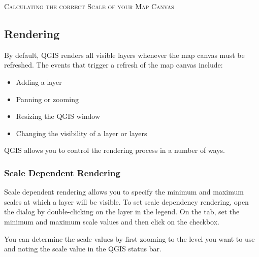 \begin{Tip}\caption{\textsc{Calculating the correct Scale of your Map Canvas}}
\end{Tip}

\subsection{Rendering}\label{subsec:redraw_events}

By default, QGIS renders all visible layers whenever the map canvas must be
refreshed. The events that trigger a refresh of the map canvas include:

\begin{itemize}
\item Adding a layer
\item Panning or zooming
\item Resizing the QGIS window
\item Changing the visibility of a layer or layers
\end{itemize}

QGIS allows you to control the rendering process in a number of ways.

\subsubsection{Scale Dependent Rendering}
\label{label_scaledepend}

Scale dependent rendering allows you to specify the minimum and maximum
scales at which a layer will be visible.  To set scale dependency rendering,
open the  dialog by double-clicking on the layer in the 
legend. On the  tab, set the minimum and maximum scale values and then
click on the  checkbox.

You can determine the scale values by first zooming to the level you want
to use and noting the scale value in the QGIS status bar.

